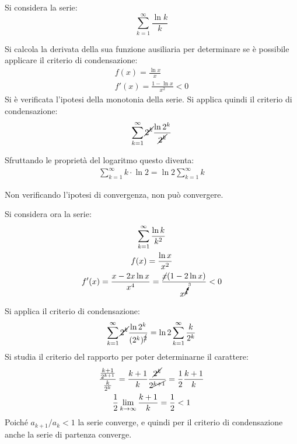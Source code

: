 \documentclass{article}
\numberwithin{equation}{subsection}
\begin{document}
Si considera la serie:
\begin{equation*}
    \displaystyle\sum_{k=1}^\infty\frac{\ln k}{k}
\end{equation*}

Si calcola la derivata della sua funzione ausiliaria per determinare se è possibile applicare il criterio di condensazione:
\begin{gather*}
    \displaystyle f(x)=\frac{\ln x}{x}\\
    f'(x)=\displaystyle\frac{1-\ln x}{x^2}<0
\end{gather*}
Si è verificata l'ipotesi della monotonia della serie. 
Si applica quindi il criterio di condensazione:
\begin{gather*}
    \displaystyle\sum_{k=1}^\infty \cancel{2^k}\frac{\ln 2^k}{\cancel{2^k}}
\end{gather*}

Sfruttando le proprietà del logaritmo questo diventa:
\begin{gather*}
    \displaystyle\sum_{k=1}^\infty k\cdot{\ln 2}=\ln 2\displaystyle\sum_{k=1}^\infty k
\end{gather*}

Non verificando l'ipotesi di convergenza, non può convergere. 

Si considera ora la serie:
\begin{gather*}
    \displaystyle\sum_{k=1}^\infty\frac{\ln k}{k^2}\\
    \displaystyle f(x)=\frac{\ln x}{x^2}\\
    f'(x)=\displaystyle\frac{x-2x\ln x}{x^4}=\frac{\cancel{x}(1-2\ln x)}{x^{\cancelto{3}{4}}}<0
\end{gather*}

Si applica il criterio di condensazione:
\begin{gather*}
    \displaystyle\sum_{k=1}^\infty \cancel{2^k}\frac{\ln 2^k}{(2^k)^{\cancel{2}}}=\ln2\sum_{k=1}^\infty\frac{k}{2^k}
\end{gather*}
Si studia il criterio del rapporto per poter determinarne il carattere:
\begin{gather*}
    \displaystyle\frac{\frac{k+1}{2^{k+1}}}{\frac{k}{2^k}}=\frac{k+1}{k}\frac{\cancel{2^k}}{2^{\cancel{k+1}}}=\frac{1}{2}\frac{k+1}{k}\\
    \frac{1}{2}\lim_{k\to\infty}\frac{k+1}{k}=\frac{1}{2}<1
\end{gather*}
Poiché $a_{k+1}/a_{k}<1$ la serie converge, e quindi per il criterio di condensazione anche la serie di partenza converge.  
\end{document}
